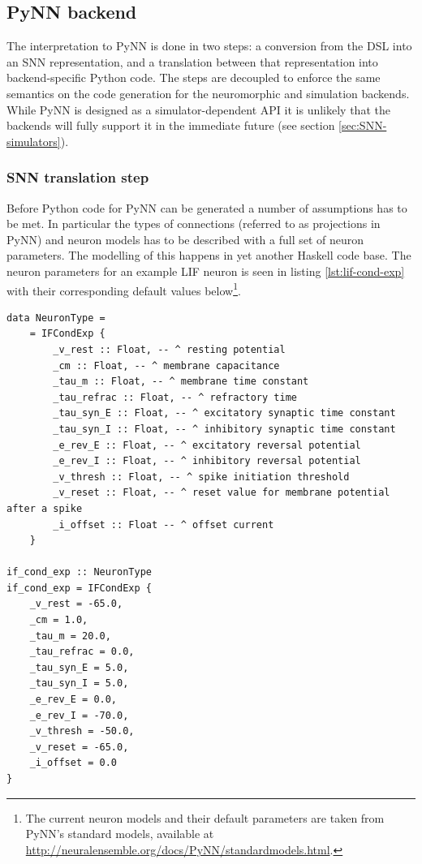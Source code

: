 \subsection{PyNN backend}
The interpretation to PyNN is done in two steps: a
conversion from the \gls{DSL} into an \gls{SNN} representation,
and a translation between that representation into backend-specific
Python code.
The steps are decoupled to enforce the same semantics on the code
generation for the neuromorphic and simulation backends.
While PyNN is designed as a simulator-dependent \gls{API} 
it is unlikely that the backends will fully support it in the
immediate future (see section \ref{sec:SNN-simulators}).

\subsubsection{\gls{SNN} translation step}
Before Python code for PyNN can be generated a number of assumptions
has to be met. 
In particular the types of connections (referred to as projections in PyNN)
and neuron models has to be described with a full set of neuron parameters.
The modelling of this happens in yet another Haskell code base.
The neuron parameters for an example LIF neuron is seen in listing
\ref{lst:lif-cond-exp} with their corresponding default values
below\footnote{
The current neuron models and their default parameters are taken from PyNN's
standard models, available at
\url{http://neuralensemble.org/docs/PyNN/standardmodels.html}.
}.

\begin{lstlisting}
data NeuronType =
    = IFCondExp {
        _v_rest :: Float, -- ^ resting potential
        _cm :: Float, -- ^ membrane capacitance
        _tau_m :: Float, -- ^ membrane time constant
        _tau_refrac :: Float, -- ^ refractory time
        _tau_syn_E :: Float, -- ^ excitatory synaptic time constant
        _tau_syn_I :: Float, -- ^ inhibitory synaptic time constant
        _e_rev_E :: Float, -- ^ excitatory reversal potential
        _e_rev_I :: Float, -- ^ inhibitory reversal potential
        _v_thresh :: Float, -- ^ spike initiation threshold
        _v_reset :: Float, -- ^ reset value for membrane potential after a spike
        _i_offset :: Float -- ^ offset current
    }

if_cond_exp :: NeuronType
if_cond_exp = IFCondExp {
    _v_rest = -65.0,
    _cm = 1.0,
    _tau_m = 20.0,
    _tau_refrac = 0.0,
    _tau_syn_E = 5.0,
    _tau_syn_I = 5.0,
    _e_rev_E = 0.0,
    _e_rev_I = -70.0,
    _v_thresh = -50.0,
    _v_reset = -65.0,
    _i_offset = 0.0
}
\end{lstlisting}

